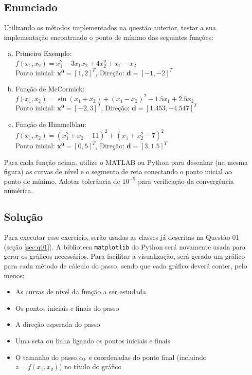 \documentclass[10pt, a4paper]{article}
\begin{document}
\subsection{Enunciado}

Utilizando os métodos implementados na questão anterior, testar a sua
implementação encontrando o ponto de mínimo das seguintes funções:

\begin{enumerate}[(a)]
  \item Primeiro Exemplo: \\
        $f(x_1, x_2) = x_1^2 - 3x_1x_2 + 4x_2^2 + x_1 - x_2$ \\
        Ponto inicial: $\mathbf{x^0} = [1, 2]^T$, Direção: $\mathbf{d} = [-1, -2]^T$\label{func:a}
  \item Função de McCormick: \\
        $f(x_1, x_2) = \sin{(x_1 + x_2)} + (x_1 - x_2)^2 - 1.5x_1 + 2.5x_2$ \\
        Ponto inicial: $\mathbf{x^0} = [-2, 3]^T$, Direção: $\mathbf{d} = [1.453, -4.547]^T$\label{func:b}
  \item Função de Himmelblau: \\
        $f(x_1, x_2) = (x_1^2 + x_2 - 11)^2 + (x_1 + x_2^2 - 7)^2$ \\
        Ponto inicial: $\mathbf{x^0} = [0, 5]^T$, Direção: $\mathbf{d} = [3, 1.5]^T$\label{func:c}
\end{enumerate}

Para cada função acima, utilize o MATLAB ou Python para desenhar (na mesma figura) as
curvas de nível e o segmento de reta conectando o ponto inicial ao ponto de mínimo.
Adotar tolerância de $10^{-5}$ para verificação da convergência numérica.

\subsection{Solução}

Para executar esse exercício, serão usadas as classes já descritas na Questão 01 (seção \ref{sec:q01}). A biblioteca {\tt matplotlib} do Python será 
novamente usada para gerar os gráficos necessários. Para facilitar a visualização, será gerado um gráfico para cada método de cálculo do passo, sendo que 
cada gráfico deverá conter, pelo menos:

\begin{itemize}
  \item As curvas de nível da função a ser estudada
  \item Os pontos iniciais e finais do passo
  \item A direção esperada do passo
  \item Uma seta ou linha ligando os pontos iniciais e finais
  \item O tamanho do passo $\alpha_k$ e coordenadas do ponto final (incluindo $z = f(x_1, x_2)$) no título do gráfico
\end{itemize}
\end{document}
